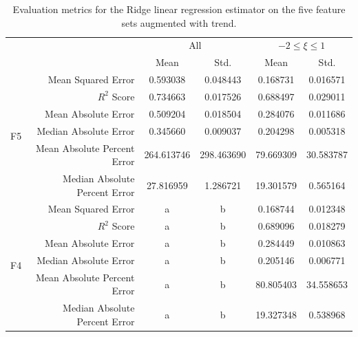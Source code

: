 \documentclass[12pt]{book}
\begin{document}
\begin{table}[]
\centering
\caption{Evaluation metrics for the Ridge linear regression estimator on the five feature sets augmented with trend.}
\begin{tabular}{c|r|c|c|c|c}
& & \multicolumn{2}{c|}{All} & \multicolumn{2}{c}{$-2\le\xi\le1$} \\
&  & Mean & Std. & Mean & Std.   \\ \hline
 \multirow{6}{*}{F5} & Mean Squared Error 					& 0.593038  		& 0.048443  & 0.168731    & 0.016571    \\
& $R^2$ Score									& 0.734663     	& 0.017526 & 0.688497    & 0.029011      \\
& Mean Absolute Error 					& 0.509204  		& 0.018504 & 0.284076    & 0.011686      \\
& Median Absolute Error 				& 0.345660 		& 0.009037   & 0.204298    & 0.005318    \\
& Mean Absolute Percent Error  	& 264.613746 	& 298.463690 & 79.669309   & 30.583787   \\
& Median Absolute Percent Error	& 27.816959  	& 1.286721  & 19.301579    & 0.565164  \\ \hline
 \multirow{6}{*}{F4} & Mean Squared Error 					& a & b & 0.168744   & 0.012348   \\
& $R^2$ Score									& a & b & 0.689096   & 0.018279   \\
& Mean Absolute Error 					& a & b & 0.284449   & 0.010863   \\
& Median Absolute Error 				& a & b & 0.205146    & 0.006771   \\
& Mean Absolute Percent Error  	& a & b & 80.805403  & 34.558653  \\
& Median Absolute Percent Error	& a & b & 19.327348   & 0.538968  
\end{tabular}
\end{table}
\end{document}
